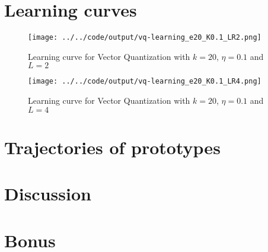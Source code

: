 \documentclass[twoside, a4paper, fleqn, reqno]{article}
\begin{document}
\section{Learning curves}

\begin{figure}[H]
	\centering
	\texttt{[image: ../../code/output/vq-learning\_e20\_K0.1\_LR2.png]}
	\caption{Learning curve for Vector Quantization with $k=20$, $\eta=0.1$ and $L=2$}
	\label{fig:vq-learning_e20_K0.1_LR2}
\end{figure}

\begin{figure}[H]
	\centering
	\texttt{[image: ../../code/output/vq-learning\_e20\_K0.1\_LR4.png]}
	\caption{Learning curve for Vector Quantization with $k=20$, $\eta=0.1$ and $L=4$}
	\label{fig:vq-learning_e20_K0.1_LR4}
\end{figure}

\section{Trajectories of prototypes}

\section{Discussion}

\section{Bonus}
\end{document}
